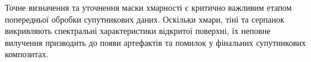 Точне визначення та уточнення маски хмарності є критично важливим етапом
попередньої обробки супутникових даних. Оскільки хмари, тіні та серпанок
викривляють спектральні характеристики відкритої поверхні, їх неповне
вилучення призводить до появи артефактів та помилок у фінальних супутникових
композитах.
